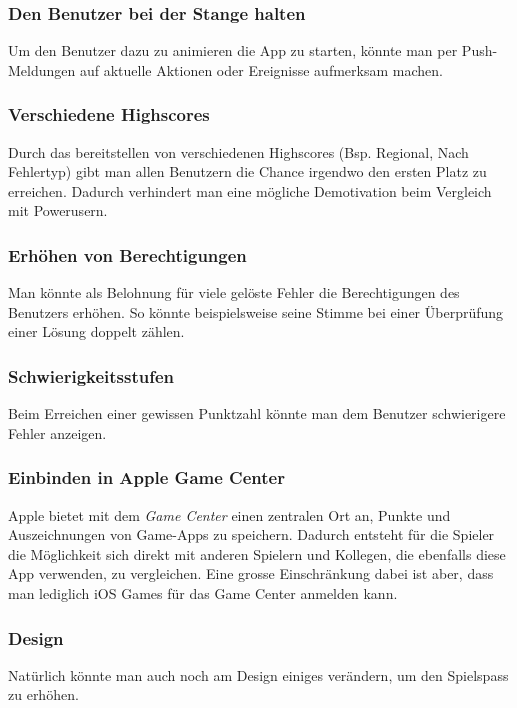 \subsubsection{Den Benutzer bei der Stange halten}
Um den Benutzer dazu zu animieren die App zu starten, könnte man per Push-Meldungen auf aktuelle Aktionen oder Ereignisse aufmerksam machen.

\subsubsection{Verschiedene Highscores}
Durch das bereitstellen von verschiedenen Highscores (Bsp. Regional, Nach Fehlertyp) gibt man allen Benutzern die Chance irgendwo den ersten Platz zu erreichen.
Dadurch verhindert man eine mögliche Demotivation beim Vergleich mit Powerusern.

\subsubsection{Erhöhen von Berechtigungen}
Man könnte als Belohnung für viele gelöste Fehler die Berechtigungen des Benutzers erhöhen. So könnte beispielsweise seine Stimme bei einer Überprüfung einer Lösung doppelt zählen. 

\subsubsection{Schwierigkeitsstufen}
Beim Erreichen einer gewissen Punktzahl könnte man dem Benutzer schwierigere Fehler anzeigen.

\subsubsection{Einbinden in Apple Game Center}
Apple bietet mit dem \emph{Game Center} einen zentralen Ort an, Punkte und Auszeichnungen von Game-Apps zu speichern.
Dadurch entsteht für die Spieler die Möglichkeit sich direkt mit anderen Spielern und Kollegen, die ebenfalls diese App verwenden, zu vergleichen.
Eine grosse Einschränkung dabei ist aber, dass man lediglich iOS Games für das Game Center anmelden kann.

\subsubsection{Design}
Natürlich könnte man auch noch am Design einiges verändern, um den Spielspass zu erhöhen.